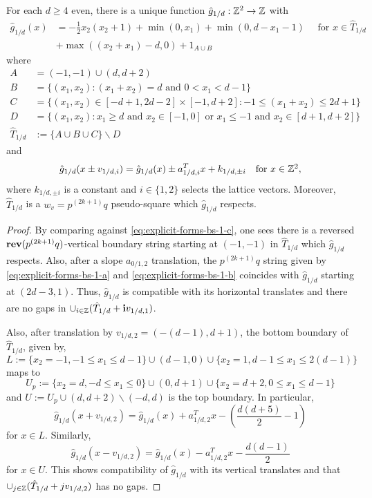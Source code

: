 \documentclass[12pt]{amsart}
\begin{document}
\begin{lemma} \label{lemma:basecase_3k_odd_alt}
	For each $d \geq 4$ even, there is a unique function $\hat{g}_{1/d}: \mathbb{Z}^2 \to \mathbb{Z}$ with 
	\[
	\begin{aligned}
	\hat{g}_{1/d}(x) &= -\frac{1}{2} x_2 (x_2 + 1) + \min(0, x_1) + \min(0, d-x_1-1) \quad \mbox{ for $x \in \hat{T}_{1/d}$} \\
	&+ \max((x_2+x_1)-d,0) + 1_{A \cup B}
	\end{aligned}
	\]
	where
	\begin{align*}
	A &=  (-1,-1) \cup (d,d+2) \\
	B &= \{ (x_1, x_2) : (x_1 + x_2) = d \mbox{ and } 0 < x_1 < d-1\} \\
	C &=  \{ (x_1, x_2) \in [-d+1, 2 d-2] \times [-1, d+2] : -1 \leq (x_1 + x_2) \leq 2d + 1\} \\ 
	D &= \{ (x_1, x_2) : x_1 \geq d \mbox{ and } x_2 \in [-1,0] \mbox{ or } x_1 \leq -1 \mbox{ and } x_2 \in [d+1,d+2] \}  \\
	\hat{T}_{1/d} &:=  \{A \cup B \cup C \} \backslash D
	\end{align*}
	and
	\[
	\hat{g}_{1/d}(x \pm v_{1/d,i}) = \hat{g}_{1/d}(x) \pm a_{1/d,i}^T x + k_{1/d, \pm i}  \quad \mbox{for $x \in \mathbb{Z}^2$},
	\]
	where $k_{1/d, \pm i}$ is a constant and $i \in \{1,2\}$ selects the lattice vectors. 	Moreover, $\hat{T}_{1/d}$ is a $w_v = p^{(2k+1)} q$ pseudo-square which $\hat{g}_{1/d}$ respects.
\end{lemma}
\begin{proof}
	By comparing against \eqref{eq:explicit-forms-bs-1-c}, one sees there is a reversed $\mathop{\bf rev}(p^{(2k+1)} q)$-vertical boundary
	string starting at $(-1,-1)$ in $\hat{T}_{1/d}$ which $\hat{g}_{1/d}$ respects. Also, after a slope $a_{0/1,2}$ translation, the $p^{(2k+1)} q$ string given by \eqref{eq:explicit-forms-bs-1-a} and \eqref{eq:explicit-forms-bs-1-b} coincides with $\hat{g}_{1/d}$ starting at $(2d-3, 1)$. Thus, $\hat{g}_{1/d}$ is compatible with its horizontal translates and there are no gaps in $\cup_{i \in \mathbb{Z}} (\hat{T}_{1/d} + \mathbf{i} v_{1/d,1})$.  
	
	Also, after translation by $v_{1/d,2} = (-(d-1), d+1)$, the bottom boundary of $\hat{T}_{1/d}$, given by,  
	\[
	L := \{ x_2 = -1, -1 \leq x_1 \leq d-1\} \cup (d-1,0) \cup \{ x_2 = 1, d-1 \leq x_1 \leq 2(d-1)\}
	\]
	maps to 
	\[
	U_p := \{ x_2 = d, -d \leq x_1 \leq 0\} \cup (0,d+1) \cup \{ x_2 = d+2, 0 \leq x_1 \leq d-1\}
	\]
	and $U := U_p \cup (d,d+2) \backslash (-d,d)$ is the top boundary. In particular, 
	\[
	\hat{g}_{1/d}(x+v_{1/d,2}) = \hat{g}_{1/d}(x) + a_{1/d,2}^T x - (\frac{d(d+5)}{2} -1) 
	\]
	for $x \in L$. Similarly, 
	\[
	\hat{g}_{1/d}(x-v_{1/d,2}) = \hat{g}_{1/d}(x) - a_{1/d,2}^T x - \frac{d(d-1)}{2}
	\]
	for $x \in U$. This shows compatibility of $\hat{g}_{1/d}$ with its vertical translates and that $\cup_{j \in \mathbb{Z}} (\hat{T}_{1/d} + j v_{1/d,2})$ has no gaps. 
\end{proof}
\end{document}
